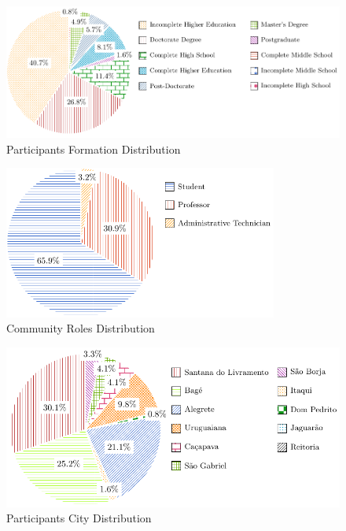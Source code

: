 \begin{figure}[!htb]
  \caption{Participants Formation Distribution}\label{fig:formation-distribution}
  \begin{center}
    \includegraphics[width=14cm]{img/5-participants-formation.pdf}
  \end{center}
\end{figure}

\begin{figure}[!htb]
  \caption{Community Roles Distribution}\label{fig:community-roles}
  \begin{center}
    \includegraphics[width=9cm]{img/5-community-roles.pdf}
  \end{center}
\end{figure}

\begin{figure}[!htb]
  \caption{Participants City Distribution}\label{fig:city-distribution}
  \begin{center}
    \includegraphics[width=12cm]{img/5-participants-city.pdf}
  \end{center}
\end{figure}

